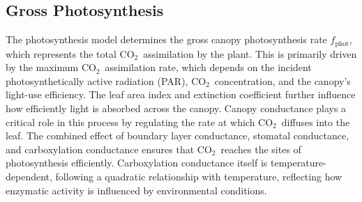 \documentclass[conference]{IEEEtran}
\newcommand{\ui}[2]{#1_{\mathrm{#2}}}
\newcommand{\coo}{\ensuremath{\mathrm{CO_2}}}
\begin{document}
\subsection{Gross Photosynthesis} The photosynthesis model determines the gross canopy photosynthesis rate \( \ui{f}{phot} \), which represents the total \coo\ assimilation by the plant. This is primarily driven by the maximum \coo\ assimilation rate, which depends on the incident photosynthetically active radiation (PAR), \coo\ concentration, and the canopy's light-use efficiency. The leaf area index and extinction coefficient further influence how efficiently light is absorbed across the canopy. Canopy conductance plays a critical role in this process by regulating the rate at which \coo\ diffuses into the leaf. The combined effect of boundary layer conductance, stomatal conductance, and carboxylation conductance ensures that \coo\ reaches the sites of photosynthesis efficiently. Carboxylation conductance itself is temperature-dependent, following a quadratic relationship with temperature, reflecting how enzymatic activity is influenced by environmental conditions.








\end{document}
